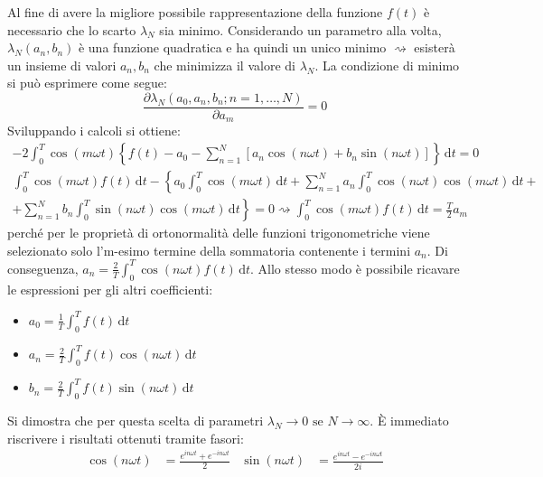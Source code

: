 Al fine di avere la migliore possibile rappresentazione della funzione \(f(t)\) è necessario che lo scarto \(\lambda _N\) sia minimo. Considerando un parametro alla volta, \(\lambda _N(a_n, b_n)\) è una funzione quadratica e ha quindi un unico minimo \(\rightsquigarrow \) esisterà un insieme di valori \(a_n, b_n\) che minimizza il valore di \(\lambda _N\). La condizione di minimo si può esprimere come segue:
\[
	\frac{\partial \lambda _N (a_0, a_n,b_n;n=1,\dots ,N)}{\partial a_m}=0 
\]
Sviluppando i calcoli si ottiene:
\begin{gather*}
	-2\int_{0}^{T} \cos (m \omega t) \left\{ f(t) - a_{0} - \sum_{n=1}^{N}[a_n \cos (n \omega t) + b_n \sin (n \omega t)]   \right\} \,\mathrm{d}t = 0\\
	\int_{0}^{T} \cos (m \omega t) f(t) \,\mathrm{d}t - \left\{a_0 \int_{0}^{T} \cos (m \omega t) \,\mathrm{d}t + \sum_{n=1}^{N} a_n \int_{0}^{T} \cos (n \omega t) \cos (m \omega t) \,\mathrm{d}t +\right.\\
	+ \left. \sum_{n=1}^{N} b_n \int_{0}^{T} \sin (n \omega t) \cos (m \omega t) \,\mathrm{d}t\right\} = 0
	\rightsquigarrow \int_{0}^{T} \cos (m \omega t) f(t) \,\mathrm{d}t = \frac{T}{2}a_m
\end{gather*}
perché per le proprietà di ortonormalità delle funzioni trigonometriche viene selezionato solo l'm-esimo termine della sommatoria contenente i termini \(a_n\).
Di conseguenza, \(a_n = \frac{2}{T} \int_{0}^{T} \cos (n \omega t) f(t) \,\mathrm{d}t \). Allo stesso modo è possibile ricavare le espressioni per gli altri coefficienti:
\begin{formula}
	\leavevmode
\begin{itemize}
	\item \(a_0 = \frac{1}{T} \int_{0}^{T} f(t) \,\mathrm{d}t \)
	\item \(a_n = \frac{2}{T} \int_{0}^{T} f(t) \cos (n \omega t) \,\mathrm{d}t \)
	\item \(b_n = \frac{2}{T} \int_{0}^{T} f(t) \sin (n \omega t) \,\mathrm{d}t \)   
\end{itemize}
\end{formula}
Si dimostra che per questa scelta di parametri \(\lambda _N \to 0 \text{ se } N \to \infty \).
È immediato riscrivere i risultati ottenuti tramite fasori:
\begin{align}
	\cos (n \omega t) &= \frac{e^{in \omega t} + e^{-in \omega t} }{2}
	&
	\sin (n \omega t) &= \frac{e^{in \omega t} - e^{-in \omega t}  }{2i}
\end{align}
